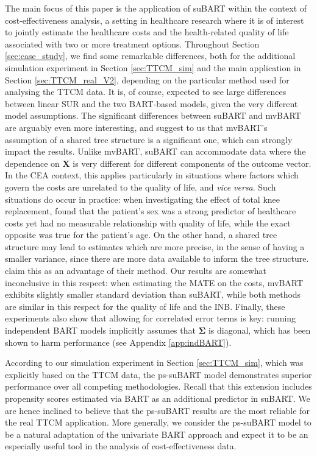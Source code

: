 \documentclass[aoas,preprint]{imsart}
\theoremstyle{plain}
\theoremstyle{definition}
\theoremstyle{remark}
\begin{document}
The main focus of this paper is the application of suBART within the context of cost-effectiveness analysis, a setting in healthcare research where it is of interest to jointly estimate the healthcare costs and the health-related quality of life associated with two or more treatment options. Throughout Section \ref{sec:case_study}, we find some remarkable differences, both for the additional simulation experiment in Section \ref{sec:TTCM_sim} and the main application in Section \ref{sec:TTCM_real_V2}, depending on the particular method used for analysing the TTCM data. It is, of course, expected to see large differences between linear SUR and the two BART-based models, given the very different model assumptions. The significant differences between suBART and mvBART are arguably even more interesting, and suggest to us that mvBART's assumption of a shared tree structure is a significant one, which can strongly impact the results. 
Unlike mvBART, suBART can accommodate data where the dependence on $\mathbf{X}$ is very different for different components of the outcome vector. In the CEA context, this applies particularly in situations where factors which govern the costs are unrelated to the quality of life, and \textit{vice versa}. Such situations do occur in practice: when investigating the effect of total knee replacement, \citet{dakin2012rationing} found that the patient's sex was a strong predictor of healthcare costs yet had no measurable relationship with quality of life, while the exact opposite was true for the patient's age. On the other hand, a shared tree structure may lead to estimates which are more precise, in the sense of having a smaller variance, since there are more data available to inform the tree structure. \citet{um2023bayesian} claim this as an advantage of their method. Our results are somewhat inconclusive in this respect: when estimating the MATE on the costs, mvBART exhibits slightly smaller standard deviation than suBART, while both methods are similar in this respect for the quality of life and the INB. Finally, these experiments also show that allowing for correlated error terms is key: running independent BART models implicitly assumes that $\boldsymbol{\Sigma}$ is diagonal, which has been shown to harm performance (see Appendix \ref{app:indBART}).

According to our simulation experiment in Section \ref{sec:TTCM_sim}, which was explicitly based on the TTCM data, the ps-suBART model demonstrates superior performance over all competing methodologies. Recall that this extension includes propensity scores estimated via BART as an additional predictor in suBART. 
We are hence inclined to believe that the ps-suBART results are the most reliable for the real TTCM application. More generally, we consider the ps-suBART model to be a natural adaptation of the univariate BART approach and expect it to be an especially useful tool in the analysis of cost-effectiveness data.
\end{document}
